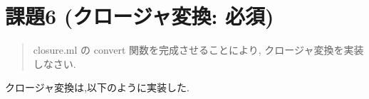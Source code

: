 \begin{comment}
LetRec式\lstinline{let rec f x = e1 in e2}の正規形では, 

\begin{itemize}

\item e1はそれまでの文脈とは独立に変換されるべきであり, 第2引数にfを用いず\lstinline{fun ce -> CompExp ce}を用いて,
\lstinline{norm_exp e1 (fun ce -> CompExp ce) sigma'} と変換している.  またe1内でxを含む可能性があるので,既存の変換に,xとfunxの対応を追加したsigma'を渡している.

\item e2 は, 内部でfを参照する可能性があるので,既存の変換に,fとfunfの対応を追加したsigma'を渡している.

\end{itemize}

また,e1, e2ともに正規形のものが, LetRec式の内部に存在する必要があるので, 他の実装とは異なり,norm\_expの呼び出しがLetRec式内部に来るようになっている.

\end{comment}

\section*{課題6 (クロージャ変換: 必須)}

\begin{quotation}
closure.ml の convert 関数を完成させることにより, クロージャ変換を実装しなさい.
\end{quotation}

クロージャ変換は,以下のように実装した.

